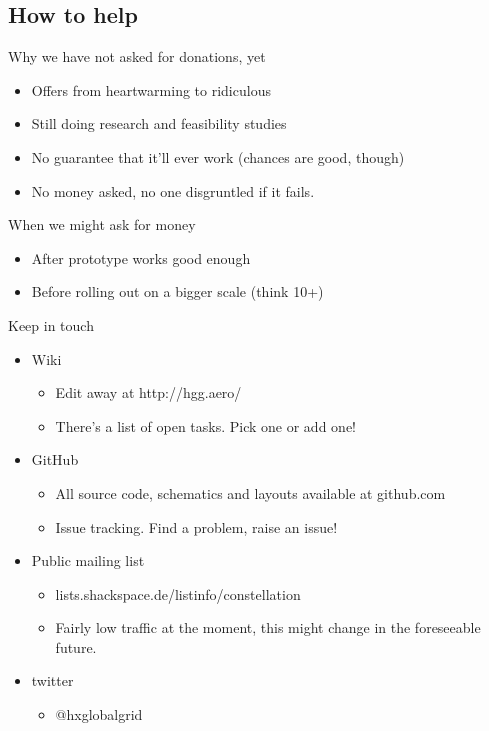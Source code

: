 \subsection{How to help}
	\begin{frame}{Why we have not asked for donations, yet}
		\begin{itemize}
			\item Offers from heartwarming to ridiculous
			\item Still doing research and feasibility studies
			\item No guarantee that it'll ever work (chances are good, though)
			\item No money asked, no one disgruntled if it fails.
		\end{itemize}
	\end{frame}
	\begin{frame}{When we might ask for money}
		\begin{itemize}
			\item After prototype works good enough
			\item Before rolling out on a bigger scale (think 10+)
		\end{itemize}
	\end{frame}
	\begin{frame}{Keep in touch}
		\begin{itemize}
			\item Wiki
			\begin{itemize}
				\item Edit away at http://hgg.aero/
				\item There's a list of open tasks.  Pick one or add one!
			\end{itemize}

			\item GitHub
			\begin{itemize}
				\item All source code, schematics and layouts available at github.com
				\item Issue tracking.  Find a problem, raise an issue!
			\end{itemize}

			\item Public mailing list
			\begin{itemize}
				\item lists.shackspace.de/listinfo/constellation
				\item Fairly low traffic at the moment, this might change in the foreseeable future.
			\end{itemize}

			\item twitter
			\begin{itemize}
				\item @hxglobalgrid
			\end{itemize}
		\end{itemize}
	\end{frame}


